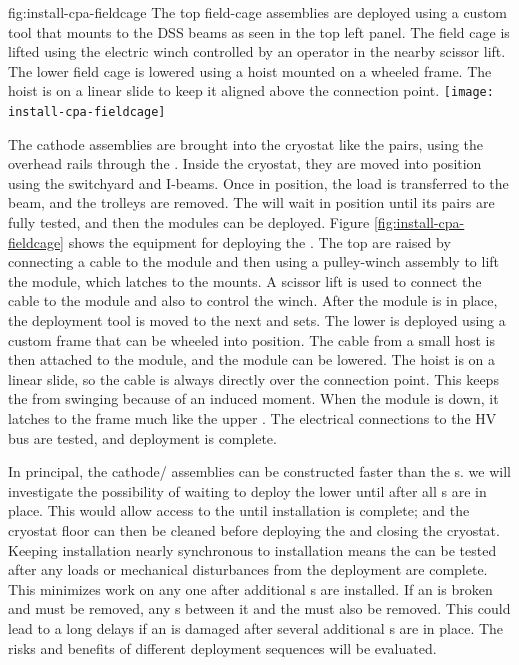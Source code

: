 \begin{dunefigure}{fig:install-cpa-fieldcage}
  {The top field-cage assemblies are deployed using a custom tool that mounts to the DSS beams as seen in the top left panel. The field cage is lifted using the electric winch controlled by an operator in the nearby scissor lift. The lower field cage is lowered using a hoist mounted on a wheeled frame. The hoist is on a linear slide to keep it aligned above the connection point.}
\texttt{[image: install-cpa-fieldcage]}
\end{dunefigure}

The cathode  assemblies are brought into the cryostat like the  pairs, using the overhead rails through the . Inside the cryostat, they are moved into position using the  switchyard and  I-beams. Once in position, the load is transferred to the  beam, and the trolleys are removed. The  will wait in position until its  pairs are fully tested, and then the  modules can be deployed. Figure \ref{fig:install-cpa-fieldcage} shows the equipment for deploying the . The top  are raised by connecting a cable to the module and then using a pulley-winch assembly to lift the module, which latches to the  mounts. A scissor lift is used to connect the cable to the module and also to control the winch. After the module is in place, the deployment tool is moved to the next and  sets. The lower  is deployed using a custom frame that can be wheeled into position. The cable from a small host  is then attached to the  module, and the module can be lowered. The hoist is on a linear slide, so the cable is always directly over the connection point. This keeps the  from swinging because of an induced moment. When the module is down, it latches to the  frame much like the upper . The electrical connections to the HV bus are tested, and deployment is complete. 

In principal, the cathode/ assemblies can be constructed faster than the s. we will investigate the possibility of waiting to deploy the lower  until after all s are in place. This would allow access to the  until installation is complete; and the cryostat floor can then be cleaned before deploying the  and closing the cryostat.
Keeping  installation nearly synchronous to  installation means the  can be tested after any loads or mechanical disturbances from the  deployment are complete. This minimizes work on any one  after additional s are installed. If an  is broken and must be removed, any s between it and the  must also be removed. This could lead to a long delays if an  is damaged after several additional s are in place. The risks and benefits of different deployment sequences will be evaluated.

